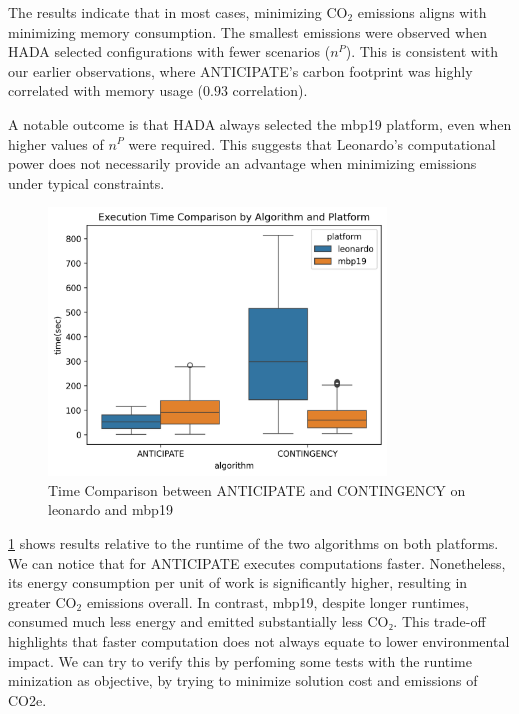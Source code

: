 \documentclass[a4paper,singleside,12pt]{report} %
\begin{document}
The results indicate that in most cases, minimizing CO$_2$ emissions aligns with minimizing memory consumption. The smallest emissions were observed when HADA selected configurations with fewer
scenarios ($n^P$). This is consistent with our earlier observations, where ANTICIPATE’s carbon footprint was highly correlated with memory usage ($0.93$ correlation).

A notable outcome is that HADA always selected the mbp19 platform, even when higher values of $n^P$ were required. This suggests that Leonardo’s computational power does not necessarily 
provide an advantage when minimizing emissions under typical constraints.

\begin{figure}[h!]
    \centering
    \includegraphics[width=0.8\textwidth]{imgs/time_comparison.png}
    \caption{Time Comparison between ANTICIPATE and CONTINGENCY on leonardo and mbp19}
    \label{fig:time_comparison}
\end{figure}

\ref{fig:time_comparison} shows results relative to the runtime of the two algorithms on both platforms. We can notice that for ANTICIPATE executes computations faster.
Nonetheless, its energy consumption per unit of work is significantly higher, resulting in greater CO$_2$ emissions overall. In contrast, mbp19, despite longer runtimes, consumed much less energy and emitted substantially less CO₂. This trade-off highlights 
that faster computation does not always equate to lower environmental impact. We can try to verify this by perfoming some tests with the runtime minization as objective, by trying to minimize
solution cost and emissions of CO2e.
\end{document}
